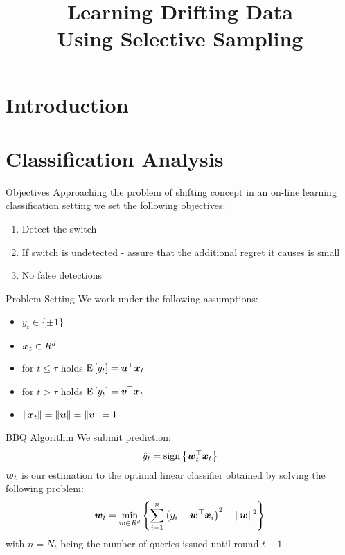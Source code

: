 \documentclass{beamer}
\title{Learning Drifting Data \\Using Selective Sampling}    %
\begin{document}
\maketitle
\section{Introduction}


\section{Classification Analysis}
\begin{frame}{Objectives}
Approaching the problem of shifting concept in an on-line learning classification setting we set the following objectives:
\begin{enumerate}
\item Detect the switch
\item If switch is undetected - assure that the additional regret it causes is small
\item No false detections
\end{enumerate}

\end{frame}

\begin{frame}{Problem Setting}
We work under the following assumptions:
\begin{itemize}
\item $y_t\in\{\pm1\}$
\item ${\boldsymbol{x}}_{t}\in R^d$
\item for $t\leq\tau$ holds ${\rm E}\left[{y_t}\right]={{\boldsymbol{u}}}^{\top}{\boldsymbol{x}}_{t}$
\item for $t>\tau$ holds ${\rm E}\left[{y_t}\right]={{\boldsymbol{v}}}^{\top}{\boldsymbol{x}}_{t}$
\item $\|{\boldsymbol{x}}_{t}\|=\|{\boldsymbol{u}}\|=\|{\boldsymbol{v}}\|=1$
\end{itemize}


\end{frame}

\begin{frame}{BBQ Algorithm}
We submit prediction:
\begin{equation}
\hat{y}_t={\rm sign}\left\{{{\boldsymbol{w}}}^{\top}_{t}{\boldsymbol{x}}_{t}\right\}
\end{equation}
\newline
${\boldsymbol{w}}_{t}$ is our estimation to the optimal linear classifier obtained by solving the following problem:
\begin{equation}
{\boldsymbol{w}}_{t}=\min_{{\boldsymbol{w}}\in R^d}{\left\{\sum\limits_{i=1}^{n}\left(y_i-{{\boldsymbol{w}}}^{\top}{\boldsymbol{x}}_{i}\right)^2+\|{\boldsymbol{w}}\|^2\right\}}
\label{RLS_prob}
\end{equation}
with $n=N_t$ being the number of queries issued until round $t-1$
\end{frame}
\end{document}
